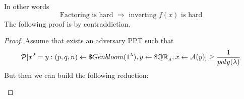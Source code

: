 In other words
\[
    \text{Factoring is hard } \Rightarrow \text{ inverting $f(x)$ is hard}
\]
The following proof is by contraddiction.
\begin{proof}
    Assume that exists an adversary PPT such that
    \[
        \mathcal{P} [ x^{2}=y:(p,q,n) \leftarrow\$ Genbloom(1^{\lambda}), y \leftarrow\$
        \mathbb{QR}_{n}, x \leftarrow \mathcal{A}(y)  ] \geq \frac{1}{poly(\lambda)}  
    \]
    But then we can build the following reduction:

\begin{figure}[h!]
   \centering
   \sdinit{}
\end{figure}

\end{proof}


